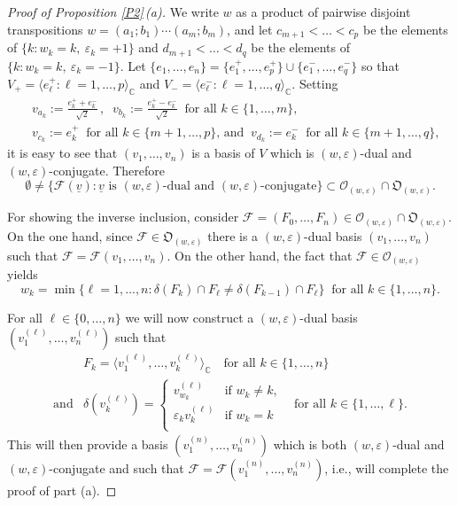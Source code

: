 \documentclass{amsart}
\theoremstyle{definition}
\begin{document}
\begin{proof}[Proof of Proposition \ref{P2}\,{\rm (a)}]
We write $w$ as a product of pairwise disjoint transpositions
$w=(a_1;b_1)\cdots(a_m;b_m)$,
and let $c_{m+1}<\ldots<c_p$ be the elements of $\{k:w_k=k,\ \varepsilon_k=+1\}$
and $d_{m+1}<\ldots<d_q$ be the elements of $\{k:w_k=k,\ \varepsilon_k=-1\}$.
Let $\{e_1,\ldots,e_n\}=\{e_1^+,\ldots,e_p^+\}\cup\{e_1^-,\ldots,e_q^-\}$
so that $V_+=\langle e_\ell^+:\ell=1,\ldots,p\rangle_\mathbb{C}$
and $V_-=\langle e_\ell^-:\ell=1,\ldots,q\rangle_\mathbb{C}$.
Setting
\begin{eqnarray*}
& v_{a_k}:=\frac{e^+_k+e^-_k}{\sqrt{2}}\,,\,\,\ v_{b_k}:=\frac{e^+_k-e^-_k}{\sqrt{2}}\ \mbox{ for all $k\in\{1,\ldots,m\}$,} \\
& v_{c_k}:=e^+_k\ \mbox{ for all $k\in\{m+1,\ldots,p\}$, \ and }\ v_{d_k}:=e^-_k\ \mbox{ for all $k\in\{m+1,\ldots,q\}$,}
\end{eqnarray*}
it is easy to see that $(v_1,\ldots,v_n)$ is a basis of $V$ which is
$(w,\varepsilon)$-dual and $(w,\varepsilon)$-conjugate.  Therefore
\begin{equation}
\label{3.5.14}
\emptyset\not=\{\mathcal{F}(\underline{v}):\mbox{$\underline{v}$ is $(w,\varepsilon)$-dual and $(w,\varepsilon)$-conjugate}\}\subset \mathcal{O}_{(w,\varepsilon)}\cap\mathfrak{O}_{(w,\varepsilon)}.
\end{equation}

        For showing the inverse inclusion, consider
$\mathcal{F}=(F_0,\ldots,F_n)\in \mathcal{O}_{(w,\varepsilon)}\cap\mathfrak{O}_{(w,\varepsilon)}$.
On the one hand, since $\mathcal{F}\in\mathfrak{O}_{(w,\varepsilon)}$ there is a $(w,\varepsilon)$-dual basis $(v_1,\ldots,v_n)$ such that
$\mathcal{F}=\mathcal{F}(v_1,\ldots,v_n)$. On the other hand, the fact that $\mathcal{F}\in\mathcal{O}_{(w,\varepsilon)}$ yields
\begin{equation}
\label{8-new}
w_k=\min\{\ell=1,\ldots,n:\delta(F_k)\cap F_\ell\not=\delta(F_{k-1})\cap F_\ell\}\ \mbox{ for all $k\in\{1,\ldots,n\}$.}
\end{equation}

For all $\ell\in\{0,\ldots,n\}$ we will now construct a $(w,\varepsilon)$-dual basis
$(v_1^{(\ell)},\ldots,v_n^{(\ell)})$ such that
\begin{eqnarray}
\label{9-new}
 & F_k=\langle v_1^{(\ell)},\ldots,v_k^{(\ell)}\rangle_\mathbb{C}\quad\mbox{for all $k\in\{1,\ldots,n\}$}
\\
\label{10-new} 
 \mbox{and} & \delta(v_k^{(\ell)})=\left\{\begin{array}{ll}
v_{w_k}^{(\ell)} & \mbox{if $w_k\not=k$,} \\
\varepsilon_k v_{k}^{(\ell)} & \mbox{if $w_k=k$} \\
\end{array}\right.\quad\mbox{for all $k\in\{1,\ldots,\ell\}$.}
\end{eqnarray}
This will then provide
a basis $(v_1^{(n)},\ldots,v_n^{(n)})$ which is both $(w,\varepsilon)$-dual and $(w,\varepsilon)$-conjugate and such that
$\mathcal{F}=\mathcal{F}(v_1^{(n)},\ldots,v_n^{(n)})$, i.e., will complete the proof of part {\rm (a)}.


\end{proof}
\end{document}
